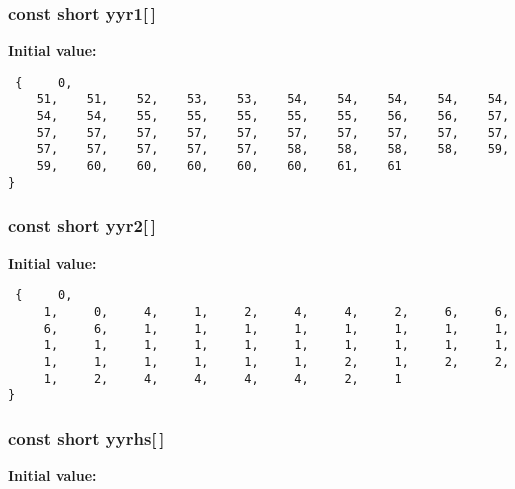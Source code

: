 \subsubsection{\setlength{\rightskip}{0pt plus 5cm}const short yyr1[$\,$]\hspace{0.3cm}{\tt  [static]}}\label{vcd__parser_8c_a89}


{\bf Initial value:}

\footnotesize\begin{verbatim} {     0,
    51,    51,    52,    53,    53,    54,    54,    54,    54,    54,
    54,    54,    55,    55,    55,    55,    55,    56,    56,    57,
    57,    57,    57,    57,    57,    57,    57,    57,    57,    57,
    57,    57,    57,    57,    57,    58,    58,    58,    58,    59,
    59,    60,    60,    60,    60,    60,    61,    61
}\end{verbatim}\normalsize 
{}
\subsubsection{\setlength{\rightskip}{0pt plus 5cm}const short yyr2[$\,$]\hspace{0.3cm}{\tt  [static]}}\label{vcd__parser_8c_a90}


{\bf Initial value:}

\footnotesize\begin{verbatim} {     0,
     1,     0,     4,     1,     2,     4,     4,     2,     6,     6,
     6,     6,     1,     1,     1,     1,     1,     1,     1,     1,
     1,     1,     1,     1,     1,     1,     1,     1,     1,     1,
     1,     1,     1,     1,     1,     1,     2,     1,     2,     2,
     1,     2,     4,     4,     4,     4,     2,     1
}\end{verbatim}\normalsize 
{}
\subsubsection{\setlength{\rightskip}{0pt plus 5cm}const short yyrhs[$\,$]\hspace{0.3cm}{\tt  [static]}}\label{vcd__parser_8c_a86}


{\bf Initial value:}

